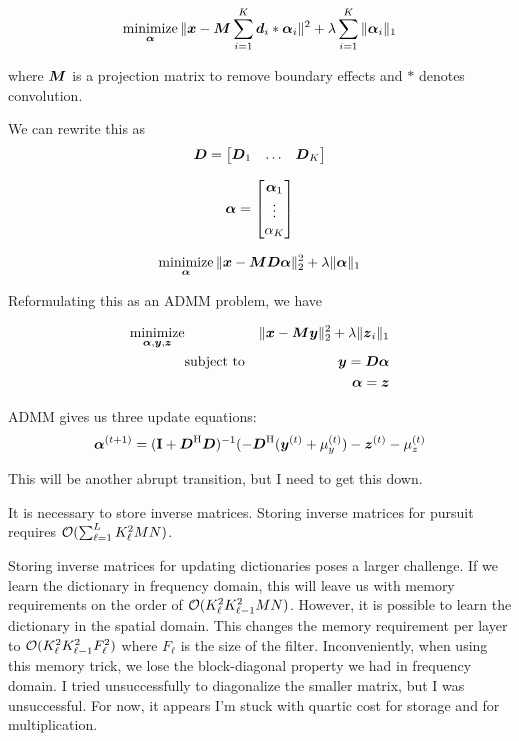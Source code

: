 \documentclass{article}
\begin{document}
\begin{equation}
\operatorname*{\text{minimize}}_{\boldsymbol{\alpha}} \|\boldsymbol{x} - \boldsymbol{M}\sum_{i = 1}^K \boldsymbol{d}_i * \boldsymbol{\alpha}_i\|^2 + \lambda \sum_{i = 1}^K \|\boldsymbol{\alpha}_i\|_1
\end{equation}

where $\boldsymbol{M}$ is a projection matrix to remove boundary effects and $*$ denotes convolution.

We can rewrite this as 
\begin{equation}
\boldsymbol{D} = \begin{bmatrix}\boldsymbol{D}_1 & \hdots & \boldsymbol{D}_K \end{bmatrix}
\end{equation}

\begin{equation}
\boldsymbol{\alpha} = \begin{bmatrix} \boldsymbol{\alpha}_1 \\ \vdots \\ \alpha_K \end{bmatrix}
\end{equation}

\begin{equation}
\operatorname*{\text{minimize}}_{\boldsymbol{\alpha}} \|\boldsymbol{x} - \boldsymbol{M}\boldsymbol{D}\boldsymbol{\alpha}\|_2^2 + \lambda \|\boldsymbol{\alpha}\|_1
\end{equation}


Reformulating this as an ADMM problem, we have

\begin{align}
\operatorname*{\text{minimize}}_{\boldsymbol{\alpha},\boldsymbol{y},\boldsymbol{z}} && \|\boldsymbol{x} - \boldsymbol{M}\boldsymbol{y}\|_2^2 + \lambda \|\boldsymbol{z}_i\|_1\\
& \text{subject to} & \boldsymbol{y} = \boldsymbol{D}\boldsymbol{\alpha}\\
&&                    \boldsymbol{\alpha} = \boldsymbol{z}\\
\end{align}

ADMM gives us three update equations:
\begin{equation}
\boldsymbol{\alpha}^{(t + 1)} = ({\bf I} + \boldsymbol{D}^{\mathrm{H}}\boldsymbol{D})^{-1}(-\boldsymbol{D}^{\mathrm{H}}(\boldsymbol{y}^{(t)} + \mu_y^{(t)}) - \boldsymbol{z}^{(t)} - \mu_z^{(t)}
\end{equation}


This will be another abrupt transition, but I need to get this down.

It is necessary to store inverse matrices. Storing inverse matrices for pursuit requires $\mathcal{O}(\sum_{\ell = 1}^{L}K_{\ell}^2MN)$.

Storing inverse matrices for updating dictionaries poses a larger challenge. If we learn the dictionary in frequency domain, this will leave us with memory requirements on the order of $\mathcal{O}(K_{\ell}^2K_{\ell - 1}^2MN)$. However, it is possible to learn the dictionary in the spatial domain. This changes the memory requirement per layer to $\mathcal{O}(K_{\ell}^2K_{\ell - 1}^2F_{\ell}^2)$ where $F_{\ell}$ is the size of the filter. Inconveniently, when using this memory trick, we lose the block-diagonal property we had in frequency domain. I tried unsuccessfully to diagonalize the smaller matrix, but I was unsuccessful. For now, it appears I'm stuck with quartic cost for storage and for multiplication.
\end{document}
